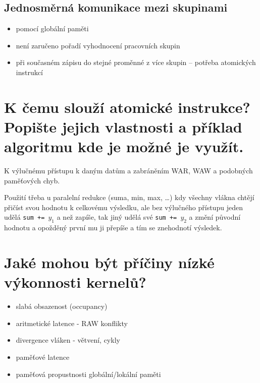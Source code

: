	\subsection*{Jednosměrná komunikace mezi skupinami}
	\begin{itemize}
		\setlength\itemsep{0em}
		\item pomocí globální paměti
		\item není zaručeno pořadí vyhodnocení pracovních skupin
		\item při současném zápisu do stejné proměnné z více skupin -- potřeba atomických instrukcí
	\end{itemize}


\section{K čemu slouží atomické instrukce? Popište jejich vlastnosti a příklad algoritmu kde je možné je využít.}
	K výlučnému přístupu k daným datům a zabráněním WAR, WAW a podobných paměťových chyb. 
	
	Použití třeba u paralelní redukce (suma, min, max, \dots) kdy všechny vlákna chtějí přičíst svou hodnotu k celkovému výsledku, ale bez výlučného přístupu jeden udělá \texttt{sum += $y_1$} a než zapíše, tak jiný udělá své \texttt{sum += $y_2$} a změní původní hodnotu a opožděný první mu ji přepíše a tím se znehodnotí výsledek.
	

\section{Jaké mohou být příčiny nízké výkonnosti kernelů?}
	\begin{itemize}
		\setlength\itemsep{0em}
		\item slabá obsazenost (occupancy)
		\item aritmetické latence - RAW konflikty
		\item divergence vláken - větvení, cykly
		\item paměťové latence
		\item paměťová propustnosti globální/lokální paměti
	\end{itemize}


